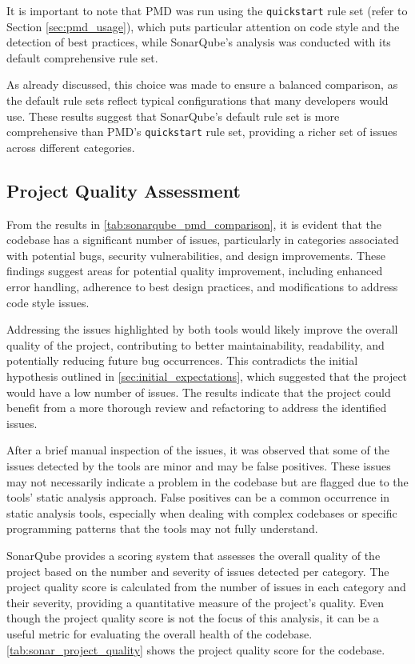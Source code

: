 It is important to note that PMD was run using the \texttt{quickstart} rule set (refer to Section \ref{sec:pmd_usage}), which puts particular attention on code style and the detection of best practices, while SonarQube’s analysis was conducted with its default comprehensive rule set.

As already discussed, this choice was made to ensure a balanced comparison, as the default rule sets reflect typical configurations that many developers would use. These results suggest that SonarQube’s default rule set is more comprehensive than PMD’s \texttt{quickstart} rule set, providing a richer set of issues across different categories.

\subsection{Project Quality Assessment}

From the results in \autoref{tab:sonarqube_pmd_comparison}, it is evident that the codebase has a significant number of issues, particularly in categories associated with potential bugs, security vulnerabilities, and design improvements. These findings suggest areas for potential quality improvement, including enhanced error handling, adherence to best design practices, and modifications to address code style issues.

Addressing the issues highlighted by both tools would likely improve the overall quality of the project, contributing to better maintainability, readability, and potentially reducing future bug occurrences. This contradicts the initial hypothesis outlined in \autoref{sec:initial_expectations}, which suggested that the project would have a low number of issues. The results indicate that the project could benefit from a more thorough review and refactoring to address the identified issues.

After a brief manual inspection of the issues, it was observed that some of the issues detected by the tools are minor and may be false positives. These issues may not necessarily indicate a problem in the codebase but are flagged due to the tools' static analysis approach. False positives can be a common occurrence in static analysis tools, especially when dealing with complex codebases or specific programming patterns that the tools may not fully understand.

SonarQube provides a scoring system that assesses the overall quality of the project based on the number and severity of issues detected per category. The project quality score is calculated from the number of issues in each category and their severity, providing a quantitative measure of the project's quality. Even though the project quality score is not the focus of this analysis, it can be a useful metric for evaluating the overall health of the codebase. \autoref{tab:sonar_project_quality} shows the project quality score for the codebase.

